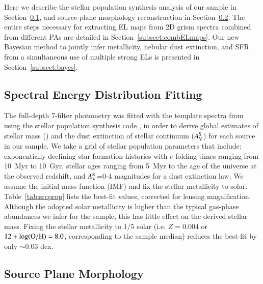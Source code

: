 Here we describe the stellar population synthesis analysis of our sample in
Section~\ref{subsect:sed}, and source plane morphology reconstruction in
Section~\ref{subsect:morph}.
The entire steps necessary for extracting EL maps from 2D grism spectra combined from
different PAs are detailed in Section~\ref{subsect:combELmaps}.
Our new Bayesian method to jointly infer metallicity, nebular dust extinction, and SFR from a
simultaneous use of multiple strong ELs is presented in Section~\ref{subsect:bayes}.

\subsection{Spectral Energy Distribution Fitting}\label{subsect:sed}

The full-depth 7-filter \hff photometry was fitted with the template spectra from
\citet{Bruzual:2003ck} using the stellar population synthesis code \fast
\citep{Kriek:2009cs}, in order to derive global estimates of stellar mass (\Mstar) and the
dust extinction of stellar continuum ($A_{\rm V}^{\rm S}$) for each source in our sample. We take a
grid of stellar population parameters that include: exponentially declining star formation
histories with $e$-folding times ranging from 10~Myr to 10~Gyr, stellar ages ranging from 5~Myr to
the age of the universe at the observed redshift, and $A_{\rm V}^{\rm S}$=0-4 magnitudes for a
\citet{Calzetti:2000iy} dust extinction law. We assume the \citet{Chabrier:2003ki}
initial mass function (IMF) and fix the stellar metallicity to solar.
Table~\ref{tab:srcprop} lists the best-fit \Mstar values, corrected for lensing
magnification.
Although the adopted solar metallicity is higher than the typical gas-phase abundances we
infer for the sample, this has little effect on the derived stellar mass. Fixing the stellar
metallicity to $1/5$ solar (i.e. $Z=0.004$ or $12+\log({\rm O/H})=8.0$, corresponding to the sample median)
reduces the best-fit \Mstar by only $\sim0.03$ dex.

\subsection{Source Plane Morphology}\label{subsect:morph}

